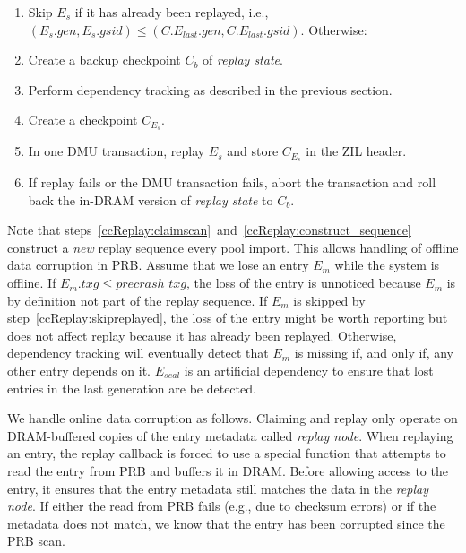\documentclass[12pt,a4paper,twoside]{book}
\begin{document}
\begin{enumerate}[noitemsep,beginpenalty=100000,midpenalty=100000]
\begin{enumerate}[noitemsep,beginpenalty=100000,midpenalty=100000]
            \item \label{ccReplay:skipreplayed} Skip $E_s$ if it has already been replayed, i.e., $(E_s.gen, E_s.gsid) \le (C.E_{last}.gen, C.E_{last}.gsid)$.
            Otherwise:
            \item Create a backup checkpoint $C_b$ of \textit{replay state}.
            \item Perform dependency tracking as described in the previous section.
            \item Create a checkpoint $C_{E_s}$.
            \item In one DMU transaction, replay $E_s$ and store $C_{E_s}$ in the ZIL header.
            \item If replay fails or the DMU transaction fails, abort the transaction and roll back the in-DRAM version of \textit{replay state} to $C_b$.
    \end{enumerate}
\end{enumerate}

Note that steps~\ref{ccReplay:claimscan}~and~\ref{ccReplay:construct_sequence} construct a \textit{new} replay sequence every pool import.
This allows handling of offline data corruption in PRB.
Assume that we lose an entry $E_m$ while the system is offline.
If $E_m.txg \le precrash\_txg$, the loss of the entry is unnoticed because $E_m$ is by definition not part of the replay sequence.
If $E_m$ is skipped by step~\ref{ccReplay:skipreplayed}, the loss of the entry might be worth reporting but does not affect replay because it has already been replayed.
Otherwise, dependency tracking will eventually detect that $E_m$ is missing if, and only if, any other entry depends on it.
$E_{seal}$ is an artificial dependency to ensure that lost entries in the last generation are be detected.

We handle online data corruption as follows.
Claiming and replay only operate on DRAM-buffered copies of the entry metadata called \textit{replay node}.
When replaying an entry, the replay callback is forced to use a special function that attempts to read the entry from PRB and buffers it in DRAM.
Before allowing access to the entry, it ensures that the entry metadata still matches the data in the \textit{replay node}.
If either the read from PRB fails (e.g., due to checksum errors) or if the metadata does not match, we know that the entry has been corrupted since the PRB scan.
\end{document}
